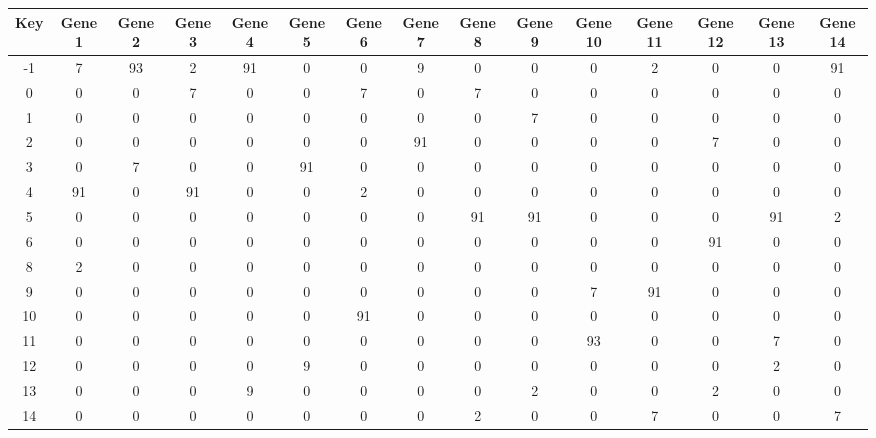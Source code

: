 \begin{tabular}{|c|c|c|c|c|c|c|c|c|c|c|c|c|c|c|}
\hline
Key & Gene 1 & Gene 2 & Gene 3 & Gene 4 & Gene 5 & Gene 6 & Gene 7 & Gene 8 & Gene 9 & Gene 10 & Gene 11 & Gene 12 & Gene 13 & Gene 14 \\
\hline
-1 & 7 & 93 & 2 & 91 & 0 & 0 & 9 & 0 & 0 & 0 & 2 & 0 & 0 & 91 \\
0 & 0 & 0 & 7 & 0 & 0 & 7 & 0 & 7 & 0 & 0 & 0 & 0 & 0 & 0 \\
1 & 0 & 0 & 0 & 0 & 0 & 0 & 0 & 0 & 7 & 0 & 0 & 0 & 0 & 0 \\
2 & 0 & 0 & 0 & 0 & 0 & 0 & 91 & 0 & 0 & 0 & 0 & 7 & 0 & 0 \\
3 & 0 & 7 & 0 & 0 & 91 & 0 & 0 & 0 & 0 & 0 & 0 & 0 & 0 & 0 \\
4 & 91 & 0 & 91 & 0 & 0 & 2 & 0 & 0 & 0 & 0 & 0 & 0 & 0 & 0 \\
5 & 0 & 0 & 0 & 0 & 0 & 0 & 0 & 91 & 91 & 0 & 0 & 0 & 91 & 2 \\
6 & 0 & 0 & 0 & 0 & 0 & 0 & 0 & 0 & 0 & 0 & 0 & 91 & 0 & 0 \\
8 & 2 & 0 & 0 & 0 & 0 & 0 & 0 & 0 & 0 & 0 & 0 & 0 & 0 & 0 \\
9 & 0 & 0 & 0 & 0 & 0 & 0 & 0 & 0 & 0 & 7 & 91 & 0 & 0 & 0 \\
10 & 0 & 0 & 0 & 0 & 0 & 91 & 0 & 0 & 0 & 0 & 0 & 0 & 0 & 0 \\
11 & 0 & 0 & 0 & 0 & 0 & 0 & 0 & 0 & 0 & 93 & 0 & 0 & 7 & 0 \\
12 & 0 & 0 & 0 & 0 & 9 & 0 & 0 & 0 & 0 & 0 & 0 & 0 & 2 & 0 \\
13 & 0 & 0 & 0 & 9 & 0 & 0 & 0 & 0 & 2 & 0 & 0 & 2 & 0 & 0 \\
14 & 0 & 0 & 0 & 0 & 0 & 0 & 0 & 2 & 0 & 0 & 7 & 0 & 0 & 7 \\
\hline
\end{tabular}